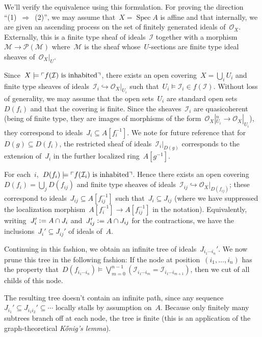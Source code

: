 \documentclass[10pt,reqno,a4paper]{amsbook}
\makeatletter
\theoremstyle{definition}
\theoremstyle{plain}
\theoremstyle{remark}
\let\acuteH\H
\newcommand{\konig}{K\acuteH onig}
\renewcommand{\H}{\mathcal{H}}
\renewcommand{\O}{\mathcal{O}}
\newcommand{\M}{\mathcal{M}}
\renewcommand{\P}{\mathcal{P}}
\newcommand{\I}{\mathcal{I}}
\DeclareMathOperator{\Spec}{Spec}
\newcommand{\?}{\,{:}\,}
\renewcommand{\_}{\mathpunct{.}\,}
\newcommand{\speak}[1]{\ulcorner\text{\textnormal{#1}}\urcorner}
\newcommand{\defeq}{\vcentcolon=}
\renewenvironment{proof}[1][\proofname]{\par
  \pushQED{\qed}%
  \normalfont \topsep6\p@\@plus6\p@\relax
  \trivlist
  \item[\hskip\labelsep
        \itshape
    #1\@addpunct{.}]\ignorespaces
}{%
  \popQED\endtrivlist\@endpefalse
}
\makeatother
\begin{document}
{\begin{proof}
%

We'll verify the equivalence using this formulation. For proving the
direction ``(1)~$\Rightarrow$~(2)'', we may assume that~$X =
\Spec A$ is affine and that internally, we are given an
ascending process on the set of finitely generated ideals of~$\O_X$.
Externally, this is a finite type sheaf of ideals~$\I$ together with a morphism~$\M
\to \P(\M)$ where~$\M$ is the sheaf whose~$U$-sections are finite type ideal
sheaves of~$\O_X|_U$.

Since~$X \models \speak{$f(\I)$ is inhabited}$, there exists an open covering~$X
= \bigcup_i U_i$ and finite type sheaves of ideals~$\I_i \hookrightarrow
\O_X|_{U_i}$ such that~$U_i \models \I_i \in f(\I)$. Without loss of generality,
we may assume that the open sets~$U_i$ are standard open sets~$D(f_i)$ and that
the covering is finite. Since the sheaves~$\I_i$ are quasicoherent (being of
finite type, they are images of morphisms of the form~$\O_X|_{U_i}^n \to
\O_X|_{U_i}$), they correspond to ideals~$J_i \subseteq A[f_i^{-1}]$. We note for future reference
that for~$D(g) \subseteq D(f_i)$, the restricted sheaf of ideals~$\I_i|_{D(g)}$
corresponds to the extension of~$J_i$ in the further
localized ring~$A[g^{-1}]$.

For each~$i$,~$D(f_i) \models \speak{$f(\I_i)$ is inhabited}$.
Hence there exists an open covering~$D(f_i) = \bigcup_j D(f_{ij})$ and finite
type sheaves of ideals~$\I_{ij} \hookrightarrow \O_X|_{D(f_{ij})}$; these
correspond to ideals~$J_{ij} \subseteq A[f_{ij}^{-1}]$ such that~$J_i
\subseteq J_{ij}$ (where we have suppressed the localization
morphism~$A[f_i^{-1}] \to A[f_{ij}^{-1}]$ in the notation). Equivalently,
writing~$J_i' \defeq A \cap J_i$ and~$J_{ij}' \defeq A \cap J_{ij}$ for the
contractions, we have the inclusions~$J_i' \subseteq J_{ij}'$ of ideals of~$A$.

Continuing in this fashion, we obtain an infinite tree of ideals~$J_{i_1 \cdots i_n}'$.
We now prune this tree in the following fashion: If the node at position~$(i_1,
\ldots, i_n)$ has the property that~$D(f_{i_1 \cdots i_n}) \models
\bigvee_{m=0}^{n-1} (\I_{i_1 \cdots i_m} = \I_{i_1 \cdots i_{m+1}})$, then we cut
of all childs of this node.

The resulting tree doesn't contain an infinite path, since any
sequence~$J_{i_1}' \subseteq J_{i_1 i_2}' \subseteq \cdots$ locally stalls by
assumption on~$A$. Because only finitely many subtrees branch off at each node,
the tree is finite (this is an application of the graph-theoretical
\emph{\konig's lemma}).


\end{proof}}
\end{document}
